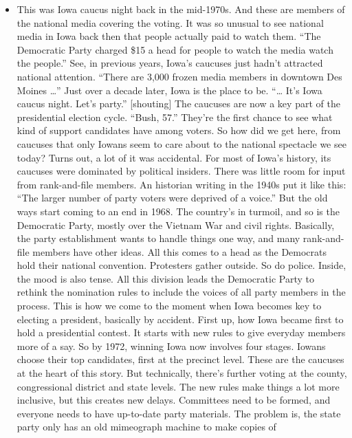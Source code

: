 \begin{itemize}
\tightlist
\item
  This was Iowa caucus night back in the mid-1970s. And these are
  members of the national media covering the voting. It was so unusual
  to see national media in Iowa back then that people actually paid to
  watch them. ``The Democratic Party charged \$15 a head for people to
  watch the media watch the people.'' See, in previous years, Iowa's
  caucuses just hadn't attracted national attention. ``There are 3,000
  frozen media members in downtown Des Moines \ldots'' Just over a
  decade later, Iowa is the place to be. ``\ldots{} It's Iowa caucus
  night. Let's party.'' {[}shouting{]} The caucuses are now a key part
  of the presidential election cycle. ``Bush, 57.'' They're the first
  chance to see what kind of support candidates have among voters. So
  how did we get here, from caucuses that only Iowans seem to care about
  to the national spectacle we see today? Turns out, a lot of it was
  accidental. For most of Iowa's history, its caucuses were dominated by
  political insiders. There was little room for input from rank-and-file
  members. An historian writing in the 1940s put it like this: ``The
  larger number of party voters were deprived of a voice.'' But the old
  ways start coming to an end in 1968. The country's in turmoil, and so
  is the Democratic Party, mostly over the Vietnam War and civil rights.
  Basically, the party establishment wants to handle things one way, and
  many rank-and-file members have other ideas. All this comes to a head
  as the Democrats hold their national convention. Protesters gather
  outside. So do police. Inside, the mood is also tense. All this
  division leads the Democratic Party to rethink the nomination rules to
  include the voices of all party members in the process. This is how we
  come to the moment when Iowa becomes key to electing a president,
  basically by accident. First up, how Iowa became first to hold a
  presidential contest. It starts with new rules to give everyday
  members more of a say. So by 1972, winning Iowa now involves four
  stages. Iowans choose their top candidates, first at the precinct
  level. These are the caucuses at the heart of this story. But
  technically, there's further voting at the county, congressional
  district and state levels. The new rules make things a lot more
  inclusive, but this creates new delays. Committees need to be formed,
  and everyone needs to have up-to-date party materials. The problem is,
  the state party only has an old mimeograph machine to make copies of

\end{itemize}

